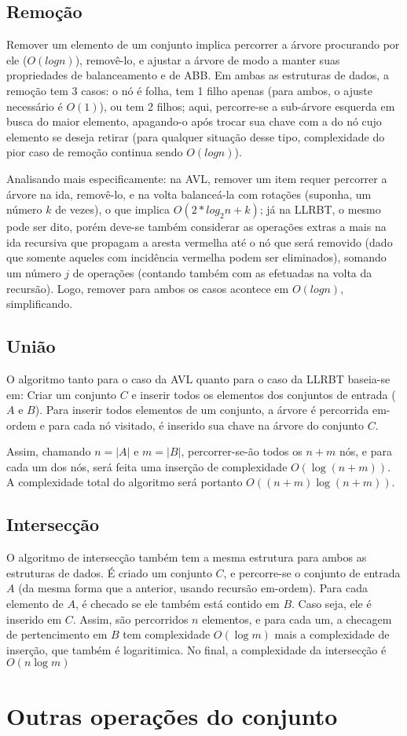 \documentclass{article}
\begin{document}
\subsection{Remoção}
Remover um elemento de um conjunto implica percorrer a árvore procurando por ele ($O(log n)$), removê-lo, e ajustar a árvore de modo a 
manter suas propriedades de balanceamento e de ABB. Em ambas as estruturas de dados, a remoção tem 3 casos: o nó é folha, tem 1
filho apenas (para ambos, o ajuste necessário é $O(1)$), ou tem 2 filhos; aqui, percorre-se a sub-árvore esquerda em busca do 
maior elemento, apagando-o após trocar sua chave com a do nó cujo elemento se deseja retirar (para qualquer situação desse tipo,
complexidade do pior caso de remoção continua sendo $O(log n)$). 

Analisando mais especificamente: na AVL, remover um item requer percorrer a árvore na ida, removê-lo, e na volta balanceá-la com
rotações (suponha, um número $k$ de vezes), o que implica $O(2*log_2 n + k)$; já na LLRBT, o mesmo pode ser dito, porém deve-se
também considerar as operações extras a mais na ida recursiva que propagam a aresta vermelha até o nó que será removido (dado que
somente aqueles com incidência vermelha podem ser eliminados), somando um número $j$ de operações (contando também com as efetuadas
na volta da recursão). Logo, remover para ambos os casos acontece em $O(log n)$, simplificando.

\subsection{União}
O algoritmo tanto para o caso da AVL quanto para o caso da LLRBT baseia-se em:
Criar um conjunto $C$ e inserir todos os elementos dos conjuntos de entrada ($A$ e $B$). Para inserir todos elementos de um
conjunto, a árvore é percorrida em-ordem e para cada nó visitado, é inserido sua chave na árvore do conjunto $C$.

Assim, chamando $n = |A|$ e $m = |B|$, percorrer-se-ão todos os $n+m$ nós, e para cada um dos nós, será feita uma inserção
de complexidade $O(\log(n+m))$. A complexidade total do algoritmo será portanto $O((n+m)\log(n+m))$.

\subsection{Intersecção}
O algoritmo de intersecção também tem a mesma estrutura para ambos as estruturas de dados. É criado um conjunto $C$, e percorre-se
o conjunto de entrada $A$ (da mesma forma que a anterior, usando recursão em-ordem). Para cada elemento de $A$, é checado se ele
também está contido em $B$. Caso seja, ele é inserido em $C$.
Assim, são percorridos $n$ elementos, e para cada um, a checagem de pertencimento em $B$ tem complexidade $O(\log m)$ mais a 
complexidade de inserção, que também é logaritimica. No final, a complexidade da intersecção é $O(n\log m)$  

\section{Outras operações do conjunto}
\end{document}
